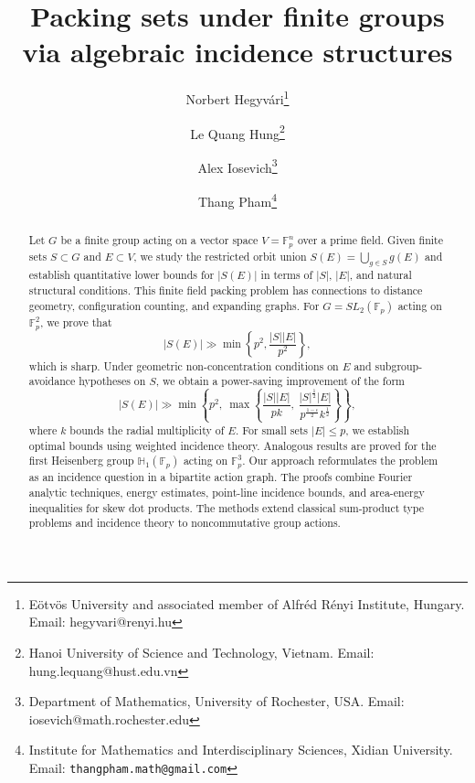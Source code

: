 \documentclass[11pt]{article}
\begin{document}
\title{Packing sets under finite groups via algebraic incidence structures}
\author{Norbert Hegyv\'{a}ri\thanks{E\"otv\"os University and associated member of Alfréd Rényi Institute, Hungary. Email: hegyvari@renyi.hu}\and Le Quang Hung\thanks{Hanoi University of Science and Technology, Vietnam. Email: hung.lequang@hust.edu.vn}\and Alex Iosevich\thanks{Department of Mathematics, University of Rochester, USA. Email: iosevich@math.rochester.edu}\and Thang Pham\thanks{Institute for Mathematics and Interdisciplinary Sciences, Xidian University. \newline
\hspace*{0.5cm} Email: {\tt thangpham.math@gmail.com}}}
\date{}
\maketitle

\begin{abstract}
Let $G$ be a finite group acting on a vector space $V = \mathbb{F}_p^n$ over a prime field. Given finite sets $S \subset G$ and $E \subset V$, we study the restricted orbit union $S(E) = \bigcup_{g\in S} g(E)$ and establish quantitative lower bounds for $|S(E)|$ in terms of $|S|$, $|E|$, and natural structural conditions. This finite field packing problem has connections to distance geometry, configuration counting, and expanding graphs. For $G = SL_2(\mathbb{F}_p)$ acting on $\mathbb{F}_p^2$, we prove that $$|S(E)| \gg \min\left\lbrace p^2, \frac{|S||E|}{p^2}\right\rbrace,$$ which is sharp. Under geometric non-concentration conditions on $E$ and subgroup-avoidance hypotheses on $S$, we obtain a power-saving improvement of the form $$|S(E)|\gg \min \left\lbrace p^2, ~\max\left\lbrace\frac{|S||E|}{pk}, ~\frac{|S|^{\frac{1}{2}}|E|}{p^{\frac{1-\epsilon}{2}}k^{\frac{1}{2}}}\right\rbrace \right\rbrace,$$ where $k$ bounds the radial multiplicity of $E$. For small sets $|E| \leq p$, we establish optimal bounds using weighted incidence theory. Analogous results are proved for the first Heisenberg group $\mathbb{H}_1(\mathbb{F}_p)$ acting on $\mathbb{F}_p^3$. Our approach reformulates the problem as an incidence question in a bipartite action graph. The proofs combine Fourier analytic techniques, energy estimates, point-line incidence bounds, and area-energy inequalities for skew dot products. The methods extend classical sum-product type problems and incidence theory to noncommutative group actions.
\end{abstract}
\end{document}
